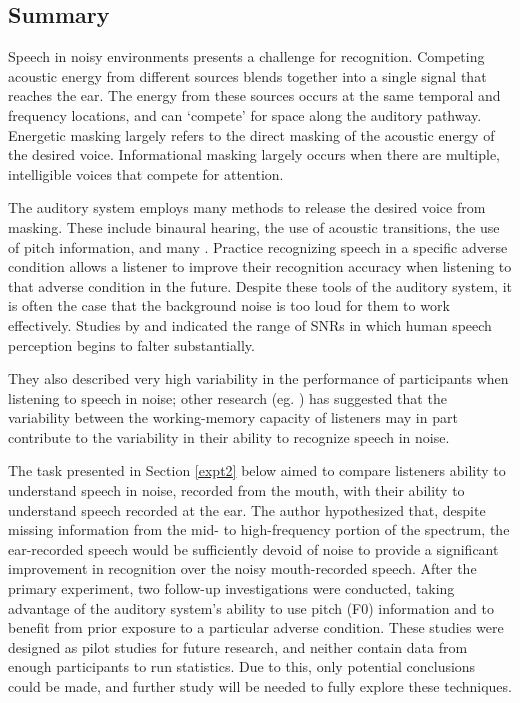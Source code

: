 \subsection{Summary}

Speech in noisy environments presents a challenge for recognition.  Competing acoustic energy from different sources blends together into a single signal that reaches the ear.  The energy from these sources occurs at the same temporal and frequency locations, and can `compete' for space along the auditory pathway.  Energetic masking largely refers to the direct masking of the acoustic energy of the desired voice.  Informational masking largely occurs when there are multiple, intelligible voices that compete for attention.

The auditory system employs many methods to release the desired voice from masking.  These include binaural hearing, the use of acoustic transitions, the use of pitch information, and many \DIFdelbegin {}\DIFdelend \DIFaddbegin {}\DIFaddend .  Practice recognizing speech in a specific adverse condition allows a listener to improve their recognition accuracy when listening to \DIFaddbegin {}\DIFaddend that adverse condition in the future.  Despite these tools of the auditory system, it is often the case that the background noise is too loud for them to work effectively.  Studies by \cite{ding:13} and \cite{gilbert:13} indicated the range of SNRs in which human speech perception begins to falter substantially.

They also described very high variability in the performance of \DIFdelbegin {}\DIFdelend participants when listening to speech in noise; other research (eg. \cite{tamati:13}) has suggested that the variability between the working-memory capacity of listeners may in part contribute to the variability in their ability to recognize speech in noise.

The task presented in Section \ref{expt2} below aimed to compare listeners ability to understand speech in noise, recorded from the mouth, with their ability to understand speech recorded at the ear.  The author hypothesized that, despite missing information from the mid- to high-frequency portion of the spectrum, the ear-recorded speech would be sufficiently devoid of noise to provide a significant improvement in recognition over the noisy mouth-recorded speech.  After the primary experiment, two follow-up investigations were conducted, taking advantage of the auditory system's ability to use pitch (F0) information and to benefit from prior exposure to a particular adverse condition.  These studies were designed as pilot studies for future research, and neither contain data from enough participants to run statistics.  Due to this, only potential conclusions could be made, and further study will be needed to fully explore these techniques. 


